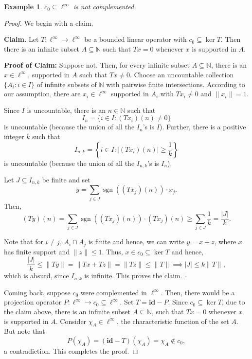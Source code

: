 \documentclass[11pt]{article}
\theoremstyle{thmstyle}
\theoremstyle{defstyle}
\newtheorem{example}[theorem]{Example}
\newcommand{\N}{\mathbb{N}}
\newcommand{\id}{\mathbf{id}}
\newcommand{\sgn}{\operatorname{sgn}}
\renewcommand{\le}{\leqslant}
\renewcommand{\ge}{\geqslant}
\begin{document}
\begin{example}
    $c_0\subseteq\ell^\infty$ is not complemented.
\end{example}
\begin{proof}
We begin with a claim. 

\noindent\textbf{Claim.} Let $T: \ell^\infty\to\ell^\infty$ be a bounded linear operator with $c_0\subseteq\ker T$. Then there is an infinite subset $A\subseteq\N$ such that $Tx = 0$ whenever $x$ is supported in $A$.

\noindent\textbf{Proof of Claim:} Suppose not. Then, for every infinite subset $A\subseteq\N$, there is an $x\in\ell^\infty$, supported in $A$ such that $Tx\ne 0$. Choose an uncountable collection $\{A_i\colon i\in I\}$ of infinite subsets of $\N$ with pairwise finite intersections. According to our assumption, there are $x_i\in\ell^\infty$ supported in $A_i$ with $Tx_i\ne 0$ and $\|x_i\| = 1$.

Since $I$ is uncountable, there is an $n\in\N$ such that 
\begin{equation*}
    I_n = \{i\in I\colon (Tx_i)(n)\ne 0\}
\end{equation*}
is uncountable (because the union of all the $I_n$'s is $I$). Further, there is a positive integer $k$ such that 
\begin{equation*}
    I_{n, k} = \left\{i\in I\colon |(Tx_i)(n)|\ge\frac
    1k\right\}
\end{equation*}
is uncountable (because the union of all the $I_{n, k}$'s is $I_n$).

Let $J\subseteq I_{n, k}$ be finite and set 
\begin{equation*}
    y = \sum_{j\in J}\sgn\left((Tx_j)(n)\right)\cdot x_j.
\end{equation*}
Then, 
\begin{equation*}
    (Ty)(n) = \sum_{j\in J}\sgn\left((Tx_j)(n)\right)\cdot(Tx_j)(n)\ge\sum_{j\in J}\frac{1}{k} = \frac{|J|}{k}.
\end{equation*}

Note that for $i\ne j$, $A_i\cap A_j$ is finite and hence, we can write $y = x + z$, where $x$ has finite support and $\|z\|\le 1$. Thus, $x\in c_0\subseteq\ker T$ and hence, 
\begin{equation*}
    \frac{|J|}{k}\le\|Ty\| = \|Tx + Tz\| = \|Tz\|\le\|T\|\implies|J|\le k\|T\|,
\end{equation*}
which is absurd, since $I_{n, k}$ is infinite. This proves the claim. $\square$

Coming back, suppose $c_0$ were complemented in $\ell^\infty$. Then, there would be a projection operator $P: \ell^\infty\to c_0\subseteq\ell^\infty$. Set $T = \id - P$. Since $c_0\subseteq\ker T$, due to the claim above, there is an infinite subset $A\subseteq\N$, such that $Tx = 0$ whenever $x$ is supported in $A$. Consider $\chi_A \in\ell^\infty$, the characteristic function of the set $A$. But note that 
\begin{equation*}
    P(\chi_A) = (\id - T)(\chi_A) = \chi_A\notin c_0,
\end{equation*}
a contradiction. This completes the proof.
\end{proof}
\end{document}
